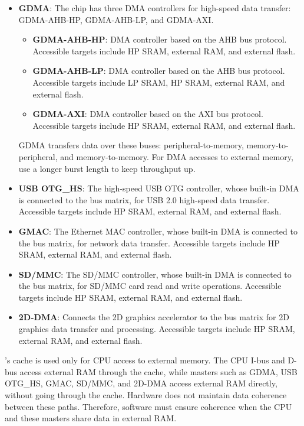 \documentclass[main\_\_EN.tex]{subfiles}
\begin{document}
\begin{itemize}
    \item \textbf{GDMA}: The chip has three DMA controllers for high-speed data transfer: GDMA-AHB-HP, GDMA-AHB-LP, and GDMA-AXI.
        \begin{itemize}
            \item \textbf{GDMA-AHB-HP}: DMA controller based on the AHB bus protocol. Accessible targets include HP SRAM, external RAM, and external flash.
            \item \textbf{GDMA-AHB-LP}: DMA controller based on the AHB bus protocol. Accessible targets include LP SRAM, HP SRAM, external RAM, and external flash.
            \item \textbf{GDMA-AXI}: DMA controller based on the AXI bus protocol. Accessible targets include HP SRAM, external RAM, and external flash.
        \end{itemize}
        GDMA transfers data over these buses: peripheral-to-memory, memory-to-peripheral, and memory-to-memory. For DMA accesses to external memory, use a longer burst length to keep throughput up.
    \item \textbf{USB OTG\_HS}: The high-speed USB OTG controller, whose built-in DMA is connected to the bus matrix, for USB 2.0 high-speed data transfer. Accessible targets include HP SRAM, external RAM, and external flash.
    \item \textbf{GMAC}: The Ethernet MAC controller, whose built-in DMA is connected to the bus matrix, for network data transfer. Accessible targets include HP SRAM, external RAM, and external flash.
    \item \textbf{SD/MMC}: The SD/MMC controller, whose built-in DMA is connected to the bus matrix, for SD/MMC card read and write operations. Accessible targets include HP SRAM, external RAM, and external flash.
    \item \textbf{2D-DMA}: Connects the 2D graphics accelerator to the bus matrix for 2D graphics data transfer and processing. Accessible targets include HP SRAM, external RAM, and external flash.
\end{itemize}

\chipname{}'s cache is used only for CPU access to external memory. The CPU I-bus and D-bus access external RAM through the cache, while masters such as GDMA, USB OTG\_HS, GMAC, SD/MMC, and 2D-DMA access external RAM directly, without going through the cache. Hardware does not maintain data coherence between these paths. Therefore, software must ensure coherence when the CPU and these masters share data in external RAM.
\end{document}

